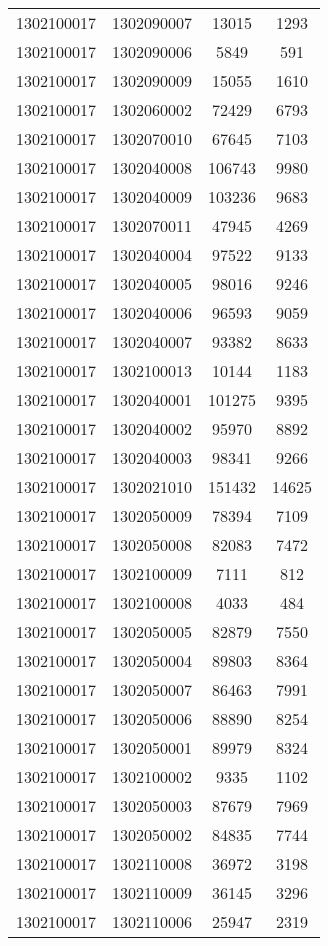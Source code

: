 \begin{longtable}[h]{llcc}
		1302100017 & 1302090007 & 13015 & 1293\\
		1302100017 & 1302090006 & 5849 & 591\\
		1302100017 & 1302090009 & 15055 & 1610\\
		1302100017 & 1302060002 & 72429 & 6793\\
		1302100017 & 1302070010 & 67645 & 7103\\
		1302100017 & 1302040008 & 106743 & 9980\\
		1302100017 & 1302040009 & 103236 & 9683\\
		1302100017 & 1302070011 & 47945 & 4269\\
		1302100017 & 1302040004 & 97522 & 9133\\
		1302100017 & 1302040005 & 98016 & 9246\\
		1302100017 & 1302040006 & 96593 & 9059\\
		1302100017 & 1302040007 & 93382 & 8633\\
		1302100017 & 1302100013 & 10144 & 1183\\
		1302100017 & 1302040001 & 101275 & 9395\\
		1302100017 & 1302040002 & 95970 & 8892\\
		1302100017 & 1302040003 & 98341 & 9266\\
		1302100017 & 1302021010 & 151432 & 14625\\
		1302100017 & 1302050009 & 78394 & 7109\\
		1302100017 & 1302050008 & 82083 & 7472\\
		1302100017 & 1302100009 & 7111 & 812\\
		1302100017 & 1302100008 & 4033 & 484\\
		1302100017 & 1302050005 & 82879 & 7550\\
		1302100017 & 1302050004 & 89803 & 8364\\
		1302100017 & 1302050007 & 86463 & 7991\\
		1302100017 & 1302050006 & 88890 & 8254\\
		1302100017 & 1302050001 & 89979 & 8324\\
		1302100017 & 1302100002 & 9335 & 1102\\
		1302100017 & 1302050003 & 87679 & 7969\\
		1302100017 & 1302050002 & 84835 & 7744\\
		1302100017 & 1302110008 & 36972 & 3198\\
		1302100017 & 1302110009 & 36145 & 3296\\
		1302100017 & 1302110006 & 25947 & 2319\\

\end{longtable}
